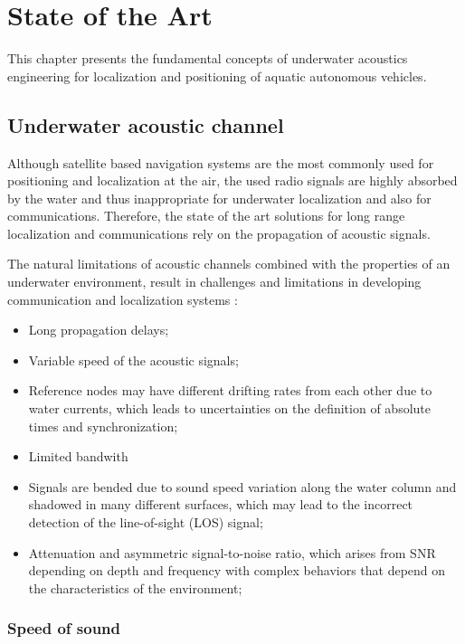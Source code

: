 \chapter{State of the Art} \label{chap:sota}

This chapter presents the fundamental concepts of underwater acoustics engineering for localization and positioning of aquatic autonomous vehicles.

\section{Underwater acoustic channel} \label{sec:acoustchann}

Although satellite based navigation systems are the most commonly used for positioning and localization at the air, the used radio signals are highly absorbed by the water and thus inappropriate for underwater localization and also for communications. Therefore, the state of the art solutions for long range localization and communications rely on the propagation of acoustic signals.

The natural limitations of acoustic channels combined with the properties of an underwater environment, result in challenges and limitations in developing communication and localization systems \cite{survey-tech-chall}:
\begin{itemize}
	\item Long propagation delays;
	\item Variable speed of the acoustic signals;
	\item Reference nodes may have different drifting rates from each other due to water currents, which leads to uncertainties on the definition of absolute times and synchronization;
	\item Limited bandwith
	\item Signals are bended due to sound speed variation along the water column and shadowed in many different surfaces, which may lead to the incorrect detection of the line-of-sight (LOS) signal;
	\item Attenuation and asymmetric signal-to-noise ratio, which arises from SNR depending on depth and frequency with complex behaviors that depend on the characteristics of the environment;
\end{itemize}

\subsection{Speed of sound} \label{subsec: speed-sound}

